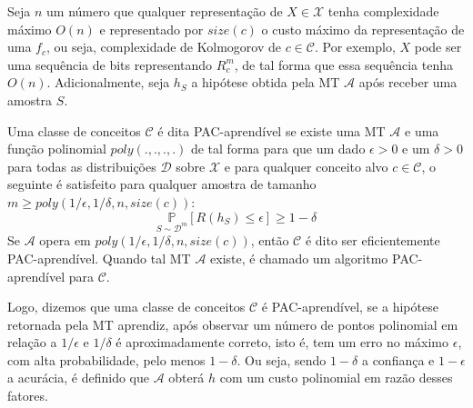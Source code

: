 

Seja $n$ um número   que qualquer
representação de $X \in \mathcal{X}$ tenha complexidade máximo $O(n)$ e representado por
$size(c)$ o custo máximo da representação de uma $f_c$, ou seja, complexidade de
Kolmogorov de $c \in \mathcal{C}$. Por exemplo, $X$ pode ser uma sequência de bits
representando $R_c^m$, de tal forma que essa sequência tenha $O(n)$. Adicionalmente,
seja $h_S$ a hipótese obtida pela MT $\mathcal{A}$ após receber uma amostra $S$.

Uma classe de conceitos $\mathcal{C}$ é dita PAC-aprendível se existe uma MT $\mathcal{A}$
e uma função polinomial $poly(.,.,.,.)$ de tal forma para que um dado $\epsilon > 0$ e
um $\delta > 0$ para todas as distribuições $\mathcal{D}$ sobre $\mathcal{X}$ e para
qualquer conceito alvo $c \in \mathcal{C}$, o seguinte é satisfeito para qualquer amostra
de tamanho $m \geq poly(1/\epsilon, 1/\delta, n, size(c))$: 
\begin{equation}
\underset{S\sim\mathcal{D}^m}{\mathbb{P}}[R(h_S)\leq\epsilon]\geq 1-\delta
\end{equation}
Se $\mathcal{A}$ opera em $poly(1/\epsilon, 1/\delta, n, size(c))$, então $\mathcal{C}$
é dito ser eficientemente PAC-aprendível. Quando tal MT $\mathcal{A}$ existe, é chamado um
algoritmo PAC-aprendível para $\mathcal{C}$.

Logo, dizemos que uma classe de conceitos $\mathcal{C}$ é PAC-aprendível, se a hipótese
retornada pela MT aprendiz, após observar um número de pontos polinomial em relação a
$1/\epsilon$ e $1/\delta$ é aproximadamente correto, isto é, tem um erro no máximo
$\epsilon$, com alta probabilidade, pelo menos $1-\delta$. Ou seja, sendo $1-\delta$ a
confiança e $1-\epsilon$ a acurácia, é definido que $\mathcal{A}$ obterá $h$ com um
custo polinomial em razão desses fatores.


